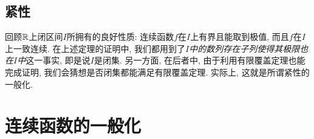 \subsection{紧性}

回顾$\mathbb{R}$上闭区间$I$所拥有的良好性质: 连续函数$f$在$I$上有界且能取到极值, 而且$f$在$I$上一致连续. 在上述定理的证明中, 我们都用到了\textit{$I$中的数列存在子列使得其极限也在$I$中}这一事实, 即是说$I$是闭集. 另一方面, 在后者中, 由于利用有限覆盖定理也能完成证明, 我们会猜想是否闭集都能满足有限覆盖定理. 实际上, 这就是所谓紧性的一般化. 





\newpage
\section{连续函数的一般化}












